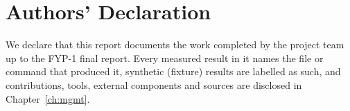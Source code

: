 \chapter*{Authors' Declaration}
We declare that this report documents the work completed by the project team up to the FYP-1 final report. Every measured result in it names the file or command that produced it, synthetic (fixture) results are labelled as such, and contributions, tools, external components and sources are disclosed in Chapter~\ref{ch:mgmt}.
